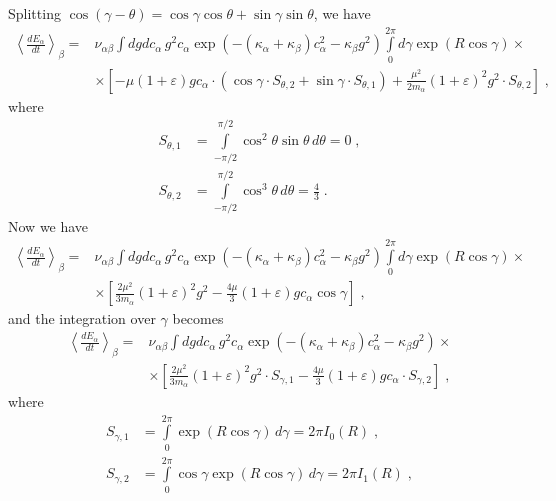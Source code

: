\documentclass[preprint, aps, pra]{revtex4-1}
\newcommand{\ab}{{\alpha\beta}}
\newcommand{\eps}{\varepsilon}
\newcommand{\kp}{\kappa}
\begin{document}
Splitting $\cos(\gamma-\theta)=\cos\gamma\cos\theta+\sin\gamma\sin\theta$, we have
\begin{equation}
  \begin{split}
    \left\langle\frac{dE_\alpha}{dt}\right\rangle_\beta = &\nu_\ab\int dg dc_\alpha\,g^2c_\alpha
    \exp(-(\kp_\alpha+\kp_\beta)c_\alpha^2-\kp_\beta g^2)\int\limits_0^{2\pi}d\gamma\exp(R\cos\gamma)\times\\
    &\times\left[-\mu(1+\eps)gc_\alpha\cdot(\cos\gamma\cdot S_{\theta,2}+\sin\gamma\cdot S_{\theta,1})
    +\frac{\mu^2}{2m_\alpha}(1+\eps)^2g^2\cdot S_{\theta,2}\right]\;,
  \end{split}
\end{equation}
where
\begin{equation}
  \begin{split}    
    S_{\theta,1} &= \int\limits_{-\pi/2}^{\pi/2}\cos^2\theta\sin\theta\,d\theta=0\;,\\
    S_{\theta,2} &= \int\limits_{-\pi/2}^{\pi/2}\cos^3\theta\,d\theta=\frac{4}{3}\;.
  \end{split}
\end{equation}
Now we have
\begin{equation}
  \begin{split}
    \left\langle\frac{dE_\alpha}{dt}\right\rangle_\beta = &\nu_\ab\int dg dc_\alpha\,g^2c_\alpha
    \exp(-(\kp_\alpha+\kp_\beta)c_\alpha^2-\kp_\beta g^2)\int\limits_0^{2\pi}d\gamma\exp(R\cos\gamma)\times\\
    &\times\left[\frac{2\mu^2}{3m_\alpha}(1+\eps)^2g^2-\frac{4\mu}{3}(1+\eps)gc_\alpha\cos\gamma\right]\;,
  \end{split}
\end{equation}
and the integration over $\gamma$ becomes
\begin{equation}
  \begin{split}
    \left\langle\frac{dE_\alpha}{dt}\right\rangle_\beta = &\nu_\ab\int dg dc_\alpha\,g^2c_\alpha
    \exp(-(\kp_\alpha+\kp_\beta)c_\alpha^2-\kp_\beta g^2)\times\\
    &\times\left[\frac{2\mu^2}{3m_\alpha}(1+\eps)^2g^2\cdot S_{\gamma,1}
    -\frac{4\mu}{3}(1+\eps)gc_\alpha\cdot S_{\gamma,2}\right]\;,
  \end{split}
\end{equation}
where
\begin{equation}
  \begin{split}
    S_{\gamma,1} &= \int\limits_{0}^{2\pi}\exp(R\cos\gamma)\,d\gamma=2\pi I_0(R)\;,\\
    S_{\gamma,2} &= \int\limits_{0}^{2\pi}\cos\gamma\exp(R\cos\gamma)\,d\gamma=2\pi I_1(R)\;,
  \end{split}
\end{equation}
\end{document}
